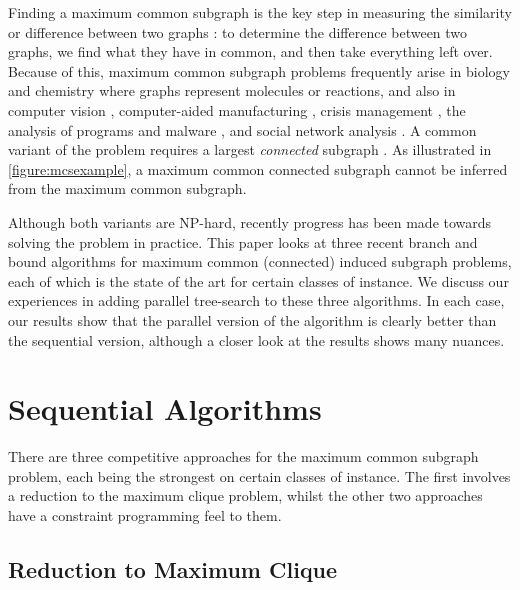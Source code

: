 \documentclass[sigconf]{acmart}
\begin{document}
Finding a maximum common subgraph is the key step in measuring the similarity or difference between
two graphs \citep{DBLP:journals/prl/Bunke97,DBLP:journals/prl/FernandezV01,o:Kriege15}: to determine
the difference between two graphs, we find what they have in common, and then take everything left
over. Because of this, maximum common subgraph problems frequently arise in biology and chemistry
\citep{DBLP:journals/jcamd/RaymondW02a,o:EhrlichR11,DBLP:journals/dam/GayFMSS14} where graphs
represent molecules or reactions, and also in computer vision
\citep{DBLP:journals/jair/CookH94,DBLP:conf/gbrpr/CombierDS13}, computer-aided manufacturing
\citep{o:LuoWSN17}, crisis management \citep{o:DelavalladeFLL16}, the analysis of programs and
malware \citep{DBLP:conf/icics/GaoRS08,DBLP:journals/compsec/ParkRS13}, and social network analysis
\citep{DBLP:journals/tkde/FangYZZ15}. A common variant of the problem requires a largest
\emph{connected} subgraph
\citep{DBLP:journals/jcamd/RaymondW02a,DBLP:conf/mco/VismaraV08,o:EhrlichR11,o:LuoWSN17}.
As illustrated in \cref{figure:mcsexample}, a maximum common connected subgraph cannot be inferred
from the maximum common subgraph.

Although both variants are NP-hard, recently progress has been made towards solving the problem in
practice.  This paper looks at three recent branch and bound algorithms for maximum common
(connected) induced subgraph problems, each of which is the state of the art for certain classes of
instance. We discuss our experiences in adding parallel tree-search to these three algorithms. In
each case, our results show that the parallel version of the algorithm is clearly better than the
sequential version, although a closer look at the results shows many nuances.

\section{Sequential Algorithms}

There are three competitive approaches for the maximum common subgraph problem, each being the
strongest on certain classes of instance. The first involves a reduction to the maximum clique
problem, whilst the other two approaches have a constraint programming feel to them.

\subsection{Reduction to Maximum Clique}
\end{document}
